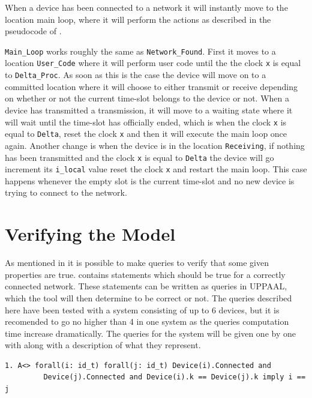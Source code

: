 When a device has been connected to a network it will instantly move to the location main loop, where it will perform the actions as described in the pseudocode of .

\texttt{Main\_Loop} works roughly the same as \texttt{Network\_Found}.
First it moves to a location \texttt{User\_Code} where it will perform user code until the the clock \texttt{x} is equal to \texttt{Delta\_Proc}.
As soon as this is the case the device will move on to a committed location where it will choose to either transmit or receive depending on whether or not the current time-slot belongs to the device or not.
When a device has transmitted a transmission, it will move to a waiting state where it will wait until the time-slot has officially ended, which is when the clock \texttt{x} is equal to \texttt{Delta}, reset the clock \texttt{x} and then it will execute the main loop once again.
Another change is when the device is in the location \texttt{Receiving}, if nothing has been transmitted and the clock \texttt{x} is equal to \texttt{Delta} the device will go increment its \texttt{i\_local} value reset the clock \texttt{x} and restart the main loop. 
This case happens whenever the empty slot is the current time-slot and no new device is trying to connect to the network.

\section{Verifying the Model}

As mentioned in  it is possible to make queries to verify that some given properties are true.
 contains statements which should be true for a correctly connected network.
These statements can be written as queries in UPPAAL, which the tool will then determine to be correct or not. 
The queries described here have been tested with a system consisting of up to 6 devices, but it is recomended to go no higher than 4 in one system as the queries computation time increase dramatically.
The queries for the system will be given one by one with along with a description of what they represent.
\begin{lstlisting}[language={[GUI]Uppaal}, % use GUI flavor
columns={[l]flexible},
frameround=fftt, frame=shadowbox, rulesepcolor=\color{gray}, title={This means that eventually it will be true that all devices are connected, and if two devices have the same time-slot \texttt{k} for as their own, it means it is the same device. }]
1. A<> forall(i: id_t) forall(j: id_t) Device(i).Connected and
		 Device(j).Connected and Device(i).k == Device(j).k imply i == j
\end{lstlisting}

